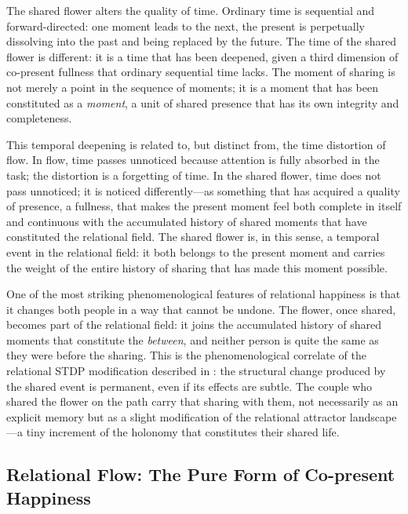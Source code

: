  The shared flower alters the quality of time. Ordinary time is sequential and forward-directed: one moment leads to the next, the present is perpetually dissolving into the past and being replaced by the future. The time of the shared flower is different: it is a time that has been deepened, given a third dimension of co-present fullness that ordinary sequential time lacks. The moment of sharing is not merely a point in the sequence of moments; it is a moment that has been constituted as a \emph{moment}, a unit of shared presence that has its own integrity and completeness.

This temporal deepening is related to, but distinct from, the time distortion of flow. In flow, time passes unnoticed because attention is fully absorbed in the task; the distortion is a forgetting of time. In the shared flower, time does not pass unnoticed; it is noticed differently---as something that has acquired a quality of presence, a fullness, that makes the present moment feel both complete in itself and continuous with the accumulated history of shared moments that have constituted the relational field. The shared flower is, in this sense, a temporal event in the relational field: it both belongs to the present moment and carries the weight of the entire history of sharing that has made this moment possible.

 One of the most striking phenomenological features of relational happiness is that it changes both people in a way that cannot be undone. The flower, once shared, becomes part of the relational field: it joins the accumulated history of shared moments that constitute the \emph{between}, and neither person is quite the same as they were before the sharing. This is the phenomenological correlate of the relational STDP modification described in : the structural change produced by the shared event is permanent, even if its effects are subtle. The couple who shared the flower on the path carry that sharing with them, not necessarily as an explicit memory but as a slight modification of the relational attractor landscape---a tiny increment of the holonomy that constitutes their shared life.

\subsection{Relational Flow: The Pure Form of Co-present Happiness}
\label{p14:subsec:relflow}

